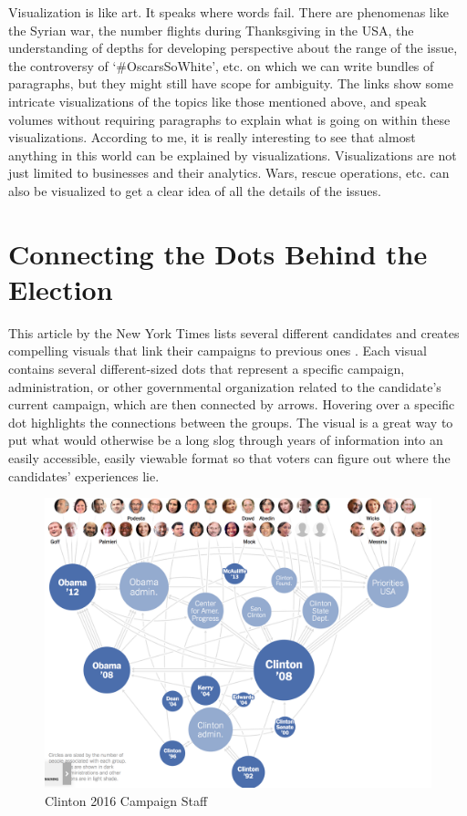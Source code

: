 \documentclass[]{book}
\theoremstyle{definition}
\theoremstyle{definition}
\theoremstyle{definition}
\theoremstyle{remark}
\begin{document}
Visualization is like art. It speaks where words fail. There are
phenomenas like the Syrian war, the number flights during Thanksgiving
in the USA, the understanding of depths for developing perspective about
the range of the issue, the controversy of `\#OscarsSoWhite', etc. on
which we can write bundles of paragraphs, but they might still have
scope for ambiguity. The links show some intricate visualizations of the
topics like those mentioned above, and speak volumes without requiring
paragraphs to explain what is going on within these visualizations.
According to me, it is really interesting to see that almost anything in
this world can be explained by visualizations. Visualizations are not
just limited to businesses and their analytics. Wars, rescue operations,
etc. can also be visualized to get a clear idea of all the details of
the issues.

\section{Connecting the Dots Behind the
Election}\label{connecting-the-dots-behind-the-election}

This article by the New York Times lists several different candidates
and creates compelling visuals that link their campaigns to previous
ones \citep{campaign_staff}\citep{cool_data}. Each visual contains
several different-sized dots that represent a specific campaign,
administration, or other governmental organization related to the
candidate's current campaign, which are then connected by arrows.
Hovering over a specific dot highlights the connections between the
groups. The visual is a great way to put what would otherwise be a long
slog through years of information into an easily accessible, easily
viewable format so that voters can figure out where the candidates'
experiences lie.

\begin{figure}
\centering
\includegraphics{images/clinton_campaign.png}
\caption{Clinton 2016 Campaign Staff}
\end{figure}
\end{document}
